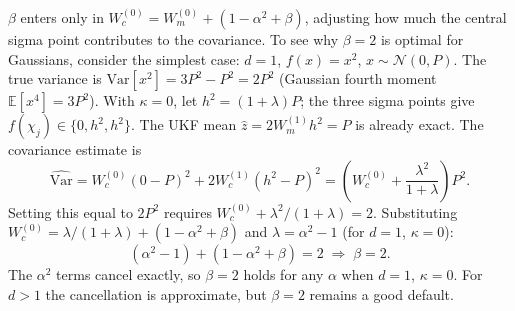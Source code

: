 \documentclass{article}
\begin{document}
$\beta$ enters only in $W_c^{(0)} = W_m^{(0)} + (1 - \alpha^2 + \beta)$, adjusting how much the central sigma point contributes to the covariance. To see why $\beta = 2$ is optimal for Gaussians, consider the simplest case: $d = 1$, $f(x) = x^2$, $x \sim \mathcal{N}(0, P)$. The true variance is $\mathrm{Var}[x^2] = 3P^2 - P^2 = 2P^2$ (Gaussian fourth moment $\mathbb{E}[x^4] = 3P^2$). With $\kappa = 0$, let $h^2 = (1+\lambda)P$; the three sigma points give $f(\chi_j) \in \{0, h^2, h^2\}$. The UKF mean $\hat{z} = 2W_m^{(1)}h^2 = P$ is already exact. The covariance estimate is
\begin{equation}
  \widehat{\mathrm{Var}} = W_c^{(0)}(0 - P)^2 + 2W_c^{(1)}(h^2 - P)^2 = \left(W_c^{(0)} + \frac{\lambda^2}{1+\lambda}\right)P^2.
\end{equation}
Setting this equal to $2P^2$ requires $W_c^{(0)} + \lambda^2/(1+\lambda) = 2$. Substituting $W_c^{(0)} = \lambda/(1+\lambda) + (1-\alpha^2+\beta)$ and $\lambda = \alpha^2 - 1$ (for $d=1$, $\kappa=0$):
\begin{equation}
  (\alpha^2 - 1) + (1 - \alpha^2 + \beta) = 2 \;\Longrightarrow\; \beta = 2.
\end{equation}
The $\alpha^2$ terms cancel exactly, so $\beta = 2$ holds for any $\alpha$ when $d=1$, $\kappa=0$. For $d > 1$ the cancellation is approximate, but $\beta = 2$ remains a good default. 
\end{document}
